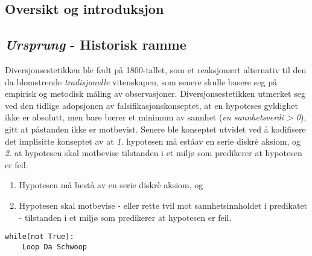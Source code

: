 
\subsection{Oversikt og introduksjon}


\subsection{{\itshape Ursprung} - Historisk ramme}

Diversjonsestetikken ble født på 1800-tallet, som et reaksjonært alternativ til den da blomstrende \emph{tradisjonelle} vitenskapen, som senere skulle basere seg på empirisk og metodisk måling av observasjoner. Diversjonsestetikken utmerket seg ved den tidlige adopsjonen av falsifikasjonskonseptet, at en hypoteses gyldighet ikke er absolutt, men bare bærer et minimum av sannhet (\emph{en sannhetsverdi > 0}), gitt at påstanden ikke er motbevist. Senere ble konseptet utvidet ved å kodifisere det implisitte konseptet av at \emph{1.} hypotesen må eståav en serie diskr\`{e} aksiom, og \emph{2.} at hypotesen skal motbevise tilstanden i et miljø som predikerer at hypotesen er feil.
\begin{enumerate}
	\item Hypotesen må bestå av en serie diskr\`{e} aksiom, og
	\item Hypotesen skal motbevise - eller rette tvil mot sannhetsinnholdet i predikatet -  tilstanden i et miljø som predikerer at hypotesen er feil.
\end{enumerate}

\begin{lstlisting}[label=some-code,caption=Komputert taktil hydrotermisk tilstandsestimasjon]
while(not True):
	Loop Da Schwoop
\end{lstlisting}
